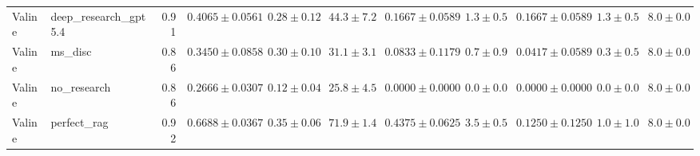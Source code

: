 \begin{table}[htbp]
\begin{tabular}{llrrrrrrrrr}
Valine & deep_research_gpt5.4 & 0.91 & $0.4065 \pm 0.0561$ & $0.28 \pm 0.12$ & $44.3 \pm 7.2$ & $0.1667 \pm 0.0589$ & $1.3 \pm 0.5$ & $0.1667 \pm 0.0589$ & $1.3 \pm 0.5$ & $8.0 \pm 0.0$ \\
Valine & ms_disc & 0.86 & $0.3450 \pm 0.0858$ & $0.30 \pm 0.10$ & $31.1 \pm 3.1$ & $0.0833 \pm 0.1179$ & $0.7 \pm 0.9$ & $0.0417 \pm 0.0589$ & $0.3 \pm 0.5$ & $8.0 \pm 0.0$ \\
Valine & no_research & 0.86 & \cellcolor{red!25}$0.2666 \pm 0.0307$ & $0.12 \pm 0.04$ & $25.8 \pm 4.5$ & $0.0000 \pm 0.0000$ & $0.0 \pm 0.0$ & $0.0000 \pm 0.0000$ & $0.0 \pm 0.0$ & $8.0 \pm 0.0$ \\
Valine & perfect_rag & 0.92 & \cellcolor{green!25}$0.6688 \pm 0.0367$ & $0.35 \pm 0.06$ & $71.9 \pm 1.4$ & $0.4375 \pm 0.0625$ & $3.5 \pm 0.5$ & $0.1250 \pm 0.1250$ & $1.0 \pm 1.0$ & $8.0 \pm 0.0$ \\
\bottomrule
\end{tabular}
\end{table}